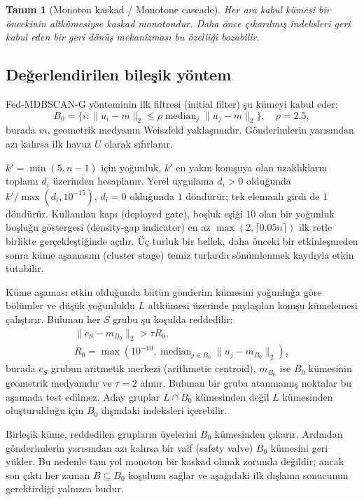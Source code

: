 \documentclass[journal]{IEEEtran}
\newtheorem{definition}{Tanım}
\newcommand{\method}{Fed-MDBSCAN-G}
\begin{document}
\begin{definition}[Monoton kaskad / Monotone cascade]\label{def:cascade}
Her ara kabul kümesi bir öncekinin altkümesiyse kaskad monotondur. Daha önce çıkarılmış indeksleri geri kabul eden bir geri dönüş mekanizması bu özelliği bozabilir.
\end{definition}

\subsection{Değerlendirilen bileşik yöntem}
\method{} yönteminin ilk filtresi (initial filter) şu kümeyi kabul eder:
\begin{equation}
B_0=\{i:\|u_i-m\|_2\leq\rho\operatorname{median}_j\|u_j-m\|_2\},\quad\rho=2.5,
\label{eq:l0}
\end{equation}
burada $m$, geometrik medyanın Weiszfeld yaklaşımıdır. Gönderimlerin yarısından azı kalırsa ilk havuz $U$ olarak sıfırlanır.

$k'=\min(5,n-1)$ için yoğunluk, $k'$ en yakın komşuya olan uzaklıkların toplamı $d_i$ üzerinden hesaplanır. Yerel uygulama $d_i>0$ olduğunda $k'/\max(d_i,10^{-15})$, $d_i=0$ olduğunda $1$ döndürür; tek elemanlı girdi de $1$ döndürür. Kullanılan kapı (deployed gate), boşluk eşiği 10 olan bir yoğunluk boşluğu göstergesi (density-gap indicator) en az $\max(2,\lceil0.05n\rceil)$ ilk retle birlikte gerçekleştiğinde açılır. Üç turluk bir bellek, daha önceki bir etkinleşmeden sonra küme aşamasını (cluster stage) temiz turlarda sönümlenmek kaydıyla etkin tutabilir.

Küme aşaması etkin olduğunda bütün gönderim kümesini yoğunluğa göre bölümler ve düşük yoğunluklu $L$ altkümesi üzerinde paylaşılan komşu kümelemesi çalıştırır. Bulunan her $S$ grubu şu koşulda reddedilir:
\begin{equation}
\begin{gathered}
\|c_S-m_{B_0}\|_2>\tau R_0,\\
R_0=\max\!\left(10^{-10},\operatorname{median}_{j\in B_0}\|u_j-m_{B_0}\|_2\right),
\end{gathered}
\label{eq:consensus}
\end{equation}
burada $c_S$ grubun aritmetik merkezi (arithmetic centroid), $m_{B_0}$ ise $B_0$ kümesinin geometrik medyanıdır ve $\tau=2$ alınır. Bulunan bir gruba atanmamış noktalar bu aşamada test edilmez. Aday gruplar $L\cap B_0$ kümesinden değil $L$ kümesinden oluşturulduğu için $B_0$ dışındaki indeksleri içerebilir.

Birleşik küme, reddedilen grupların üyelerini $B_0$ kümesinden çıkarır. Ardından gönderimlerin yarısından azı kalırsa bir valf (safety valve) $B_0$ kümesini geri yükler. Bu nedenle tam yol monoton bir kaskad olmak zorunda değildir; ancak son çıktı her zaman $B\subseteq B_0$ koşulunu sağlar ve aşağıdaki ilk dışlama sonucunun gerektirdiği yalnızca budur.
\end{document}
